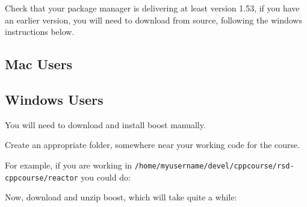 \begin{Shaded}
\begin{Highlighting}[]
 
\end{Highlighting}
\end{Shaded}

Check that your package manager is delivering at least version 1.53, if
you have an earlier version, you will need to download from source,
following the windows instructions below.

\subsection{Mac Users}\label{mac-users}

\begin{Shaded}
\begin{Highlighting}[]
 
\end{Highlighting}
\end{Shaded}

\subsection{Windows Users}\label{windows-users}

You will need to download and install boost manually.

Create an appropriate folder, somewhere near your working code for the
course.

For example, if you are working in
\texttt{/home/myusername/devel/cppcourse/rsd-cppcourse/reactor} you
could do:

\begin{Shaded}
\begin{Highlighting}[]
 
 
\end{Highlighting}
\end{Shaded}

Now, download and unzip boost, which will take quite a while:

\begin{Shaded}
\begin{Highlighting}[]
 
         \KeywordTok{>} 
 
\end{Highlighting}
\end{Shaded}

